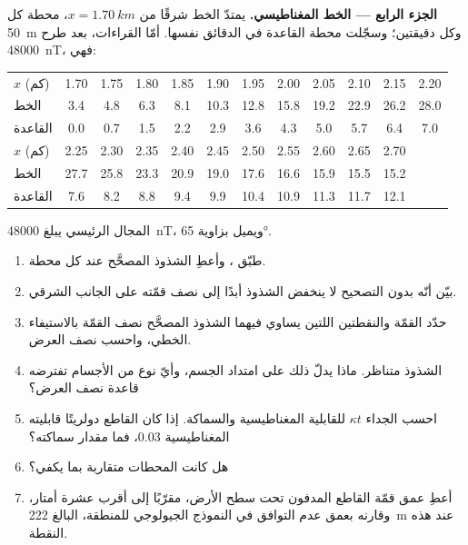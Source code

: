 \begin{problem}
\medskip\noindent\textbf{الجزء الرابع --- الخط المغناطيسي.} يمتدّ الخط
شرقًا من $x = \qty{1.70}{km}$، محطة كل \qty{50}{m} وكل
دقيقتين؛ وسجّلت محطة القاعدة في الدقائق نفسها. أمّا
القراءات، بعد طرح \qty{48000}{nT}، فهي:
\begin{center}
\small
\setlength{\tabcolsep}{3.5pt}
\begin{tabular}{lccccccccccc}
\hline
$x$ (كم) & 1.70 & 1.75 & 1.80 & 1.85 & 1.90 & 1.95 & 2.00 & 2.05 & 2.10 & 2.15 & 2.20 \\
الخط & 3.4 & 4.8 & 6.3 & 8.1 & 10.3 & 12.8 & 15.8 & 19.2 & 22.9 & 26.2 & 28.0 \\
القاعدة & 0.0 & 0.7 & 1.5 & 2.2 & 2.9 & 3.6 & 4.3 & 5.0 & 5.7 & 6.4 & 7.0 \\
\hline
$x$ (كم) & 2.25 & 2.30 & 2.35 & 2.40 & 2.45 & 2.50 & 2.55 & 2.60 & 2.65 & 2.70 & \\
الخط & 27.7 & 25.8 & 23.3 & 20.9 & 19.0 & 17.6 & 16.6 & 15.9 & 15.5 & 15.2 & \\
القاعدة & 7.6 & 8.2 & 8.8 & 9.4 & 9.9 & 10.4 & 10.9 & 11.3 & 11.7 & 12.1 & \\
\hline
\end{tabular}
\end{center}
المجال الرئيسي يبلغ \qty{48000}{nT}، ويميل بزاوية \ang{65}.
\begin{enumerate}[resume]
\item طبّق ، وأعطِ الشذوذ المصحَّح عند
  كل محطة.
\item بيّن أنّه بدون التصحيح لا ينخفض الشذوذ أبدًا إلى نصف
  قمّته على الجانب الشرقي.
\item حدّد القمّة والنقطتين اللتين يساوي فيهما الشذوذ المصحَّح
  نصف القمّة بالاستيفاء الخطي، واحسب نصف العرض.
\item الشذوذ متناظر. ماذا يدلّ ذلك على امتداد
  الجسم، وأيّ نوع من الأجسام تفترضه قاعدة نصف العرض؟
\item احسب الجداء $\kappa t$ للقابلية المغناطيسية والسماكة.
  إذا كان القاطع دولريتًا قابليته المغناطيسية \num{0.03}، فما مقدار
  سماكته؟
\item هل كانت المحطات متقاربة بما يكفي؟
\item أعطِ عمق قمّة القاطع المدفون تحت سطح الأرض، مقرّبًا
  إلى أقرب عشرة أمتار، وقارنه بعمق
  عدم التوافق في النموذج الجيولوجي للمنطقة، البالغ \qty{222}{m} عند هذه
  النقطة.
\end{enumerate}
\end{problem}
